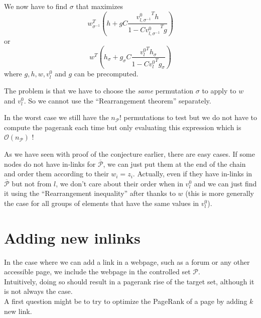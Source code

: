 \documentclass{article}
\newcommand{\bigoh}{\mathcal{O}}
\newcommand{\1}{\mathbf{1}}
\theoremstyle{definition}
\begin{document}
We now have to find \(\sigma\) that maximizes
\[ w_{\sigma^{-1}}^T \left(h + g C \frac{{v_{l,\sigma^{-1}}^0}^Th}{1 - C {v_{l,\sigma^{-1}}^0}^Tg}\right) \]
or
\[ w^T \left(h_\sigma + g_\sigma C \frac{{v_l^0}^Th_\sigma}{1 - C {v_l^0}^Tg_\sigma}\right) \]
where \(g,h,w,v_l^0\) and \(g\) can be precomputed.

The problem is that we have to choose the \emph{same} permutation \(\sigma\) to apply to \(w\) and \(v_l^0\).
So we cannot use the ``Rearrangement theorem'' separately.

In the worst case we still have the \(n_\mathcal{P}!\) permutations to test
but we do not have to compute the pagerank each time but only evaluating this expression which is \(\bigoh(n_\mathcal{P})\) !

As we have seen with proof of the conjecture earlier, there are easy cases.
If some nodes do not have in-links for \(\overline{\mathcal{P}}\), we can just put them at the end of the chain and order them
according to their \(w_i = z_i\).
Actually, even if they have in-links in \(\overline{\mathcal{P}}\) but not from \(l\),
we don't care about their order when in \(v_l^0\) and we can just find it using the ``Rearrangement inequality'' after thanks to \(w\) (this is more generally the case for all groups of elements that have the same values in \(v_l^0\)).

%

\section{Adding new inlinks}
In the case where we can add a link in a webpage, such as a forum or any other accessible page, we include the webpage in the controlled set \(\mathcal{P}\).\\
Intuitively, doing so should result in a pagerank rise of the target set, although it is not always the case.\\
A first question might be to try to optimize the PageRank of a page
by adding \(k\) new link.
\end{document}
